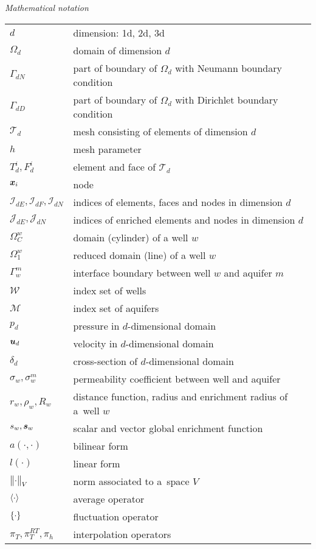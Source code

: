 \noindent\emph{Mathematical notation}
\vspace{0.5cm}

\begin{tabularx}{0.9\linewidth}{@{}lX@{}}
$d$ & dimension: 1d, 2d, 3d \\
$\Omega_d$ & domain of dimension $d$ \\
$\Gamma_{dN}$ & part of boundary of $\Omega_d$ with Neumann boundary condition \\
$\Gamma_{dD}$ & part of boundary of $\Omega_d$ with Dirichlet boundary condition \\
$\mathcal T_d$ & mesh consisting of elements of dimension $d$ \\
$h$ & mesh parameter \\
$T^i_d, F^i_d$  & element and face of $\mathcal T_d$ \\
$\mathbf{\boldsymbol{x}}_i$ & node \\
$\mathcal I_{dE}, \mathcal I_{dF}, \mathcal I_{dN}$ & indices of elements, faces and nodes in dimension $d$ \\
$\mathcal J_{dE}, \mathcal J_{dN}$ & indices of enriched elements and nodes in dimension $d$ \\
$\Omega^w_C$ & domain (cylinder) of a well $w$ \\
$\Omega^w_1$ & reduced domain (line) of a well $w$ \\
$\Gamma^m_w$ & interface boundary between well $w$ and aquifer $m$ \\
$\mathcal W$ & index set of wells \\
$\mathcal M$ & index set of aquifers \\
$p_d$ & pressure in $d$-dimensional domain \\
$\mathbf{\boldsymbol{u}}_d$ & velocity in $d$-dimensional domain \\
$\delta_d$ & cross-section of $d$-dimensional domain \\
$\sigma_w, \sigma^m_w$ & permeability coefficient between well and aquifer \\
$r_w, \rho_w, R_w$ & distance function, radius and enrichment radius of a~well $w$ \\
$s_w, \mathbf{\boldsymbol{s}}_w$ & scalar and vector global enrichment function\\
$a(\cdot, \cdot)$ & bilinear form \\
$l(\cdot)$ & linear form \\
$\bigl\Vert\cdot\bigr\Vert_V$ & norm associated to a~space $V$\\
$\langle\cdot\rangle$ & average operator \\
$\{\cdot\}$ & fluctuation operator \\
$\pi_T, \pi^{RT}_T, \pi_h$ & interpolation operators \\
\end{tabularx}
